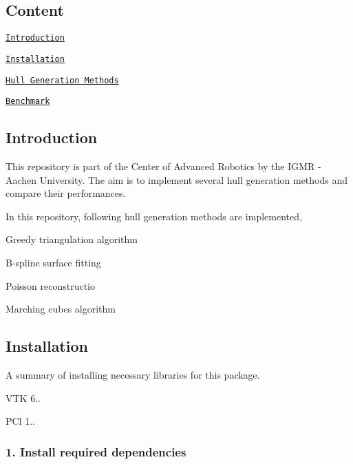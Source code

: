 



\subsection*{Content}


\begin{DoxyItemize}
\item \href{#introduction}{\tt Introduction}
\item \href{#installation}{\tt Installation}
\item \href{#hull-generation-methods}{\tt Hull Generation Methods}
\item \href{#benchmark}{\tt Benchmark} 


\end{DoxyItemize}

\subsection*{Introduction}

This repository is part of the Center of Advanced Robotics by the I\+G\+MR -\/ Aachen University. The aim is to implement several hull generation methods and compare their performances.

In this repository, following hull generation methods are implemented,


\begin{DoxyItemize}
\item Greedy triangulation algorithm
\item B-\/spline surface fitting
\item Poisson reconstructio
\item Marching cubes algorithm 


\end{DoxyItemize}

\subsection*{Installation}

A summary of installing necessary libraries for this package.
\begin{DoxyItemize}
\item V\+TK 6..
\item P\+Cl 1.. 


\end{DoxyItemize}

\subsubsection*{1. Install required dependencies}


